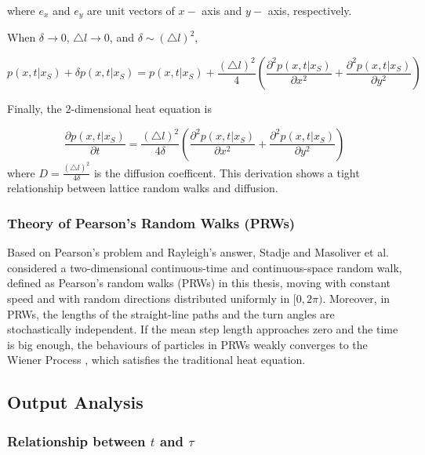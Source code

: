 where $e_x$ and $e_y$ are unit vectors of $x-$ axis and $y-$ axis, respectively. 


When $\delta \rightarrow 0$, $\triangle l \rightarrow 0$, and $\delta \sim (\triangle l)^2$, 

\begin{equation}
  p(x, t | x_{S}) + \delta p(x, t | x_{S}) = p(x, t | x_{S}) +
  \frac{(\triangle l)^2}{4} (\frac{\partial ^2 p(x, t|
    x_{S})}{\partial x^2} + \frac{\partial^2 p (x, t| x_{S})}{\partial
    y^2})
\end{equation}

Finally, the $2$-dimensional heat equation is

\begin{equation}
  \frac{\partial p(x, t| x_{S})}{\partial t} = \frac{(\triangle
    l)^2}{4 \delta} (\frac{\partial ^2 p(x, t| x_{S})}{\partial x^2} +
  \frac{\partial^2 p (x, t| x_{S})}{\partial y^2})
\end{equation}
where $D = \frac{(\triangle l)^2}{4 \delta}$ is the diffusion
coefficent. This derivation shows a tight relationship between
lattice random walks and diffusion.


\subsubsection{Theory of Pearson's Random Walks (PRWs)}

Based on Pearson's problem and Rayleigh's answer, Stadje
\cite{stadje1987exact} and Masoliver et al. \cite{masoliver1993some}
considered a two-dimensional continuous-time and continuous-space
random walk, defined as Pearson's random walks (PRWs) in this thesis,
moving with constant speed and with random directions distributed
uniformly in $[0, 2\pi)$. Moreover, in PRWs, the lengths of the
  straight-line paths and the turn angles are stochastically
  independent. If the mean step length approaches zero and the time is
  big enough, the behaviours of particles in PRWs weakly converges to
  the Wiener Process \cite{stadje1987exact}, which satisfies the
  traditional heat equation.
  
  
\subsection{Output Analysis}

\subsubsection{Relationship between $t$ and $\tau$}

